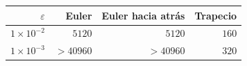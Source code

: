 \begin{tabular}{r r r r}
\toprule
\rowcolor{Azul1!50}
$\varepsilon$ & Euler & Euler hacia atrás & Trapecio \\
\midrule
$1\times10^{-2}$ & $5120$ & $5120$ & $160$ \\
$1\times10^{-3}$ & $>40960$ & $>40960$ & $320$ \\
\bottomrule
\end{tabular}
